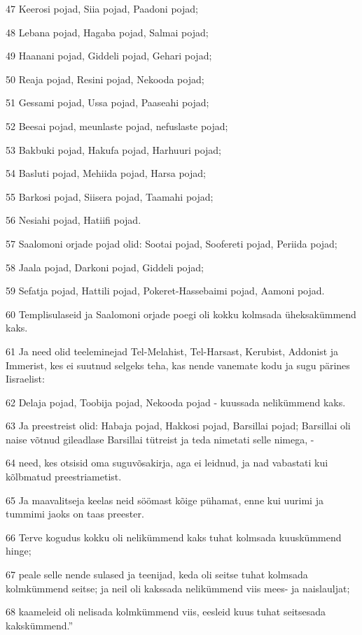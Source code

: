 \par 47 Keerosi pojad, Siia pojad, Paadoni pojad;
\par 48 Lebana pojad, Hagaba pojad, Salmai pojad;
\par 49 Haanani pojad, Giddeli pojad, Gehari pojad;
\par 50 Reaja pojad, Resini pojad, Nekooda pojad;
\par 51 Gessami pojad, Ussa pojad, Paaseahi pojad;
\par 52 Beesai pojad, meunlaste pojad, nefuslaste pojad;
\par 53 Bakbuki pojad, Hakufa pojad, Harhuuri pojad;
\par 54 Basluti pojad, Mehiida pojad, Harsa pojad;
\par 55 Barkosi pojad, Siisera pojad, Taamahi pojad;
\par 56 Nesiahi pojad, Hatiifi pojad.
\par 57 Saalomoni orjade pojad olid: Sootai pojad, Soofereti pojad, Periida pojad;
\par 58 Jaala pojad, Darkoni pojad, Giddeli pojad;
\par 59 Sefatja pojad, Hattili pojad, Pokeret-Hassebaimi pojad, Aamoni pojad.
\par 60 Templisulaseid ja Saalomoni orjade poegi oli kokku kolmsada üheksakümmend kaks.
\par 61 Ja need olid teeleminejad Tel-Melahist, Tel-Harsast, Kerubist, Addonist ja Immerist, kes ei suutnud selgeks teha, kas nende vanemate kodu ja sugu pärines Iisraelist:
\par 62 Delaja pojad, Toobija pojad, Nekooda pojad - kuussada nelikümmend kaks.
\par 63 Ja preestreist olid: Habaja pojad, Hakkosi pojad, Barsillai pojad; Barsillai oli naise võtnud gileadlase Barsillai tütreist ja teda nimetati selle nimega, -
\par 64 need, kes otsisid oma suguvõsakirja, aga ei leidnud, ja nad vabastati kui kõlbmatud preestriametist.
\par 65 Ja maavalitseja keelas neid söömast kõige pühamat, enne kui uurimi ja tummimi jaoks on taas preester.
\par 66 Terve kogudus kokku oli nelikümmend kaks tuhat kolmsada kuuskümmend hinge;
\par 67 peale selle nende sulased ja teenijad, keda oli seitse tuhat kolmsada kolmkümmend seitse; ja neil oli kakssada nelikümmend viis mees- ja naislauljat;
\par 68 kaameleid oli nelisada kolmkümmend viis, eesleid kuus tuhat seitsesada kakskümmend.”
